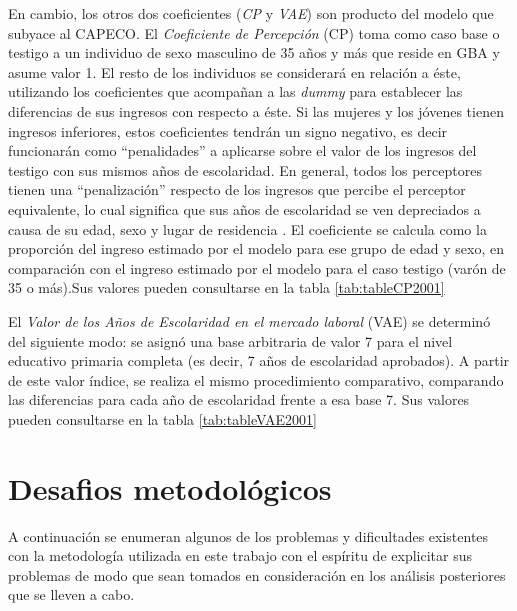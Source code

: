 En cambio, los otros dos coeficientes (\textit{CP} y \textit{VAE}) son producto del modelo que subyace al CAPECO. El \textit{Coeficiente de Percepción} (CP) toma como caso base o testigo a un individuo de sexo masculino de 35 años y más que reside en GBA y asume valor 1. El resto de los individuos se considerará en relación a éste, utilizando los coeficientes que acompañan a las \textit{dummy} para establecer las diferencias de sus ingresos con respecto a éste. Si las mujeres y los jóvenes tienen ingresos inferiores, estos coeficientes tendrán un signo negativo, es decir funcionarán como “penalidades” a aplicarse sobre el valor de los ingresos del testigo
con sus mismos años de escolaridad. En general, todos los perceptores tienen una “penalización” respecto de los ingresos que percibe el perceptor equivalente, lo cual significa que sus años de escolaridad se ven depreciados a causa de su edad, sexo y lugar de residencia \cite{indec2016b}. El coeficiente se calcula como la proporción del ingreso estimado por el modelo para ese grupo de edad y sexo, en comparación con el ingreso estimado por el modelo para el caso testigo (varón de 35 o más).Sus valores pueden consultarse en la tabla \ref{tab:tableCP2001}


El \textit{Valor de los Años de Escolaridad en el mercado laboral} (VAE) se determinó del siguiente modo: se asignó una base arbitraria de valor 7 para el nivel educativo primaria completa (es decir, 7 años de escolaridad aprobados). A partir de este valor índice, se realiza el mismo procedimiento comparativo, comparando las diferencias para cada año de escolaridad frente a esa base 7. Sus valores pueden consultarse en la tabla \ref{tab:tableVAE2001}
 

	\section{Desafios metodológicos}
	
A continuación se enumeran algunos de los problemas y dificultades existentes con la metodología utilizada en este trabajo con el espíritu de explicitar sus problemas de modo que sean tomados en consideración en los análisis posteriores que se lleven a cabo.	

